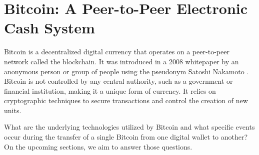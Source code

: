 \section{Bitcoin: A Peer-to-Peer Electronic Cash System}
Bitcoin is a decentralized digital currency that operates on a peer-to-peer network called the blockchain. It was introduced in a 2008
whitepaper by an anonymous person or group of people using the pseudonym Satoshi Nakamoto \cite{nakamoto2008bitcoin}. Bitcoin is not
controlled by any central authority, such as a government or financial institution, making it a unique form of currency. It relies on
cryptographic techniques to secure transactions and control the creation of new units.

What are the underlying technologies utilized by Bitcoin and what specific events occur during the transfer of a single Bitcoin from one
digital wallet to another? On the upcoming sections, we aim to answer those questions.













